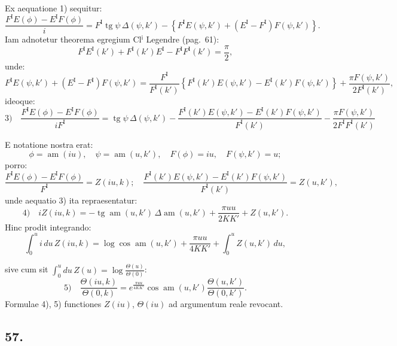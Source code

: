 \documentclass{article}
\begin{document}
Ex aequatione 1) sequitur:
\[
\frac{F^{\mathrm{I}}E(\phi)-E^{\mathrm{I}}F(\phi)}{i}=F^{\mathrm{I}}\operatorname{tg}\psi\,\Delta(\psi,k')-\left\{F^{\mathrm{I}}E(\psi,k')+(E^{\mathrm{I}}-F^{\mathrm{I}})F(\psi,k')\right\}.
\]
Iam adnotetur theorema egregium Cl$^{\mathrm{i}}$ Legendre (pag.\ 61):
\[
F^{\mathrm{I}}E^{\mathrm{I}}(k')+F^{\mathrm{I}}(k')E^{\mathrm{I}}-F^{\mathrm{I}}F^{\mathrm{I}}(k')=\frac{\pi}{2},
\]
unde:
\[
F^{\mathrm{I}}E(\psi,k')+(E^{\mathrm{I}}-F^{\mathrm{I}})F(\psi,k')=\frac{F^{\mathrm{I}}}{F^{\mathrm{I}}(k')}\left\{F^{\mathrm{I}}(k')E(\psi,k')-E^{\mathrm{I}}(k')F(\psi,k')\right\}+\frac{\pi F(\psi,k')}{2F^{\mathrm{I}}(k')},
\]
ideoque:
\[
\text{3)}\quad \frac{F^{\mathrm{I}}E(\phi)-E^{\mathrm{I}}F(\phi)}{iF^{\mathrm{I}}}=\operatorname{tg}\psi\,\Delta(\psi,k')-\frac{F^{\mathrm{I}}(k')E(\psi,k')-E^{\mathrm{I}}(k')F(\psi,k')}{F^{\mathrm{I}}(k')}-\frac{\pi F(\psi,k')}{2F^{\mathrm{I}}F^{\mathrm{I}}(k')}
\]

E notatione nostra erat:
\[
\phi=\operatorname{am}(iu),\quad \psi=\operatorname{am}(u,k'),\quad F(\phi)=iu,\quad F(\psi,k')=u;
\]
porro:
\[
\frac{F^{\mathrm{I}}E(\phi)-E^{\mathrm{I}}F(\phi)}{F^{\mathrm{I}}}=Z(iu,k);\quad \frac{F^{\mathrm{I}}(k')E(\psi,k')-E^{\mathrm{I}}(k')F(\psi,k')}{F^{\mathrm{I}}(k')}=Z(u,k'),
\]
unde aequatio 3) ita repraesentatur:
\[
\text{4)}\quad iZ(iu,k)=-\operatorname{tg}\operatorname{am}(u,k')\,\Delta\operatorname{am}(u,k')+\frac{\pi uu}{2KK'}+Z(u,k').
\]
Hinc prodit integrando:
\[
\int_{0}^{u}i\,du\,Z(iu,k)=\log\cos\operatorname{am}(u,k')+\frac{\pi uu}{4KK'}+\int_{0}^{u}Z(u,k')\,du,
\]

sive cum sit $\displaystyle\int_{0}^{u}du\,Z(u)=\log\frac{\Theta(u)}{\Theta(0)}$:
\[
\text{5)}\quad \frac{\Theta(iu,k)}{\Theta(0,k)}=e^{\frac{\pi uu}{4KK'}}\cos\operatorname{am}(u,k')\frac{\Theta(u,k')}{\Theta(0,k')}.
\]
Formulae 4), 5) functiones $Z(iu)$, $\Theta(iu)$ ad argumentum reale revocant.

\subsection*{57.}
\end{document}
